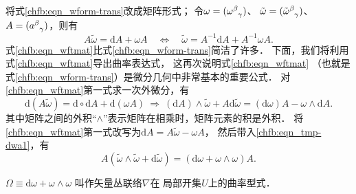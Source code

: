 将式\eqref{chfb:eqn_wform-trans}改成矩阵形式；
令$\omega=(\omega_{\hphantom{\alpha}\gamma}^\beta)$、
$\tilde{\omega}=(\tilde{\omega}_{\hphantom{\alpha}\gamma}^\beta)$、
$A=(a_{\hphantom{\alpha}\gamma}^\beta)$，则有
\begin{equation}\label{chfb:eqn_wftmat}
    A \tilde{\omega}= \mathrm{d}A + \omega A
    \quad \Leftrightarrow \quad
    \tilde{\omega}= A^{-1} \mathrm{d}A + A^{-1}\omega A .
\end{equation}
式\eqref{chfb:eqn_wftmat}比式\eqref{chfb:eqn_wform-trans}简洁了许多．
下面，我们将利用式\eqref{chfb:eqn_wftmat}导出曲率表达式，
这再次说明式\eqref{chfb:eqn_wftmat}
（也就是式\eqref{chfb:eqn_wform-trans}）是微分几何中非常基本的重要公式．
对\eqref{chfb:eqn_wftmat}第一式求一次外微分，有
\begin{equation}\label{chfb:eqn_tmp-dwa1}
    \mathrm{d} (A \tilde{\omega})= \mathrm{d}\circ\mathrm{d}A + \mathrm{d}(\omega A)
    \ \Rightarrow \
    (\mathrm{d} A)\wedge \tilde{\omega}+ A \mathrm{d} \tilde{\omega} 
    =(\mathrm{d}\omega) A - \omega\wedge \mathrm{d} A .
\end{equation}
其中矩阵之间的外积“$\wedge$”表示矩阵在相乘时，矩阵元素的积是外积．
将\eqref{chfb:eqn_wftmat}第一式改写为$\mathrm{d} A = A \tilde{\omega}-\omega A $，
然后带入\eqref{chfb:eqn_tmp-dwa1}，有
\begin{equation}\label{chfb:eqn_ATheta}
    A (\tilde{\omega}\wedge \tilde{\omega} + \mathrm{d} \tilde{\omega} )
    =(\mathrm{d}\omega +  \omega\wedge\omega )A .
\end{equation}


\begin{definition}
    $\Omega \equiv \mathrm{d}\omega +  \omega\wedge\omega$ 叫作矢量丛联络$\nabla$在
    局部开集$U$上的{\heiti 曲率型式}．
\end{definition}

